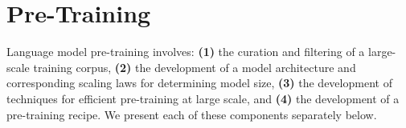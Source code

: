\section{Pre-Training}
\label{section:pretraining}

Language model pre-training involves: \textbf{(1)} the curation and filtering of a large-scale training corpus, \textbf{(2)} the development of a model architecture and corresponding scaling laws for determining model size, \textbf{(3)} the development of techniques for efficient pre-training at large scale, and \textbf{(4)} the development of a pre-training recipe. We present each of these components separately below.





